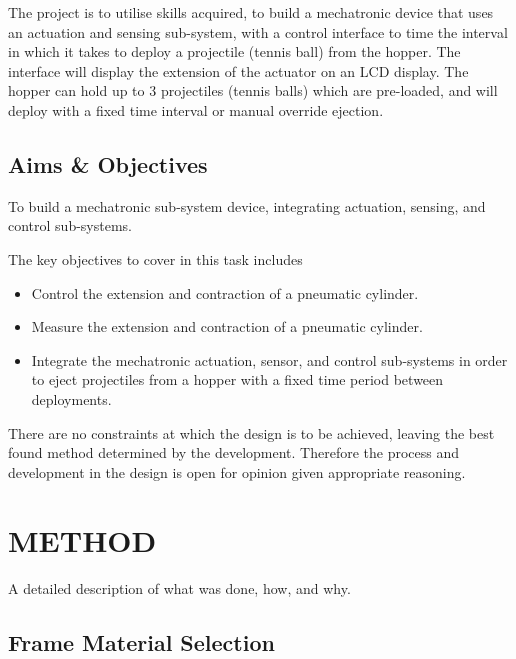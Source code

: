 \documentclass[a4paper, 10pt]{IEEEconf}
\begin{document}
The project is to utilise skills acquired, to build a mechatronic device that uses an actuation and sensing sub-system, with a control interface to time the interval in which it takes to deploy a projectile (tennis ball) from the hopper. The interface will display the extension of the actuator on an LCD display. The hopper can hold up to 3 projectiles (tennis balls) which are pre-loaded, and will deploy with a fixed time interval or manual override ejection.


\subsection{Aims \& Objectives}

To build a mechatronic sub-system device, integrating actuation, sensing, and control sub-systems.

The key objectives to cover in this task includes

\begin{itemize}
	\item Control the extension and contraction of a pneumatic cylinder.
	\item Measure the extension and contraction of a pneumatic cylinder.
	\item Integrate the mechatronic actuation, sensor, and control sub-systems in order to eject projectiles from a hopper with a fixed time period between deployments.
\end{itemize}

There are no constraints at which the design is to be achieved, leaving the best found method determined by the development. Therefore the process and development in the design is open for opinion given appropriate reasoning.


\section{METHOD}

A detailed description of what was done, how, and why. 


\subsection{Frame Material Selection}
\end{document}
